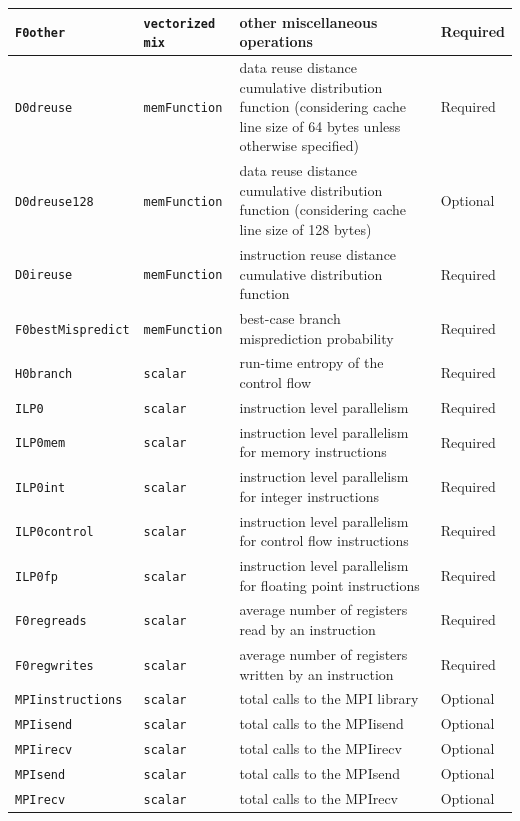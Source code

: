 \documentclass[a4paper, 10pt]{article}
\begin{document}
\begin{table}[t!]
\begin{tabular}{|p{3.8cm} | p{1.5cm} ||p{7.6cm}| p{1.7cm} |}
\hline
\texttt{F0other} &\texttt{vectorized mix} & other miscellaneous operations & Required \\
\hline
\texttt{D0dreuse} &\texttt{memFunction} & data reuse distance cumulative distribution function
(considering cache line size of 64 bytes unless otherwise specified) & Required \\
\hline
\texttt{D0dreuse128} &\texttt{memFunction} & data reuse distance cumulative distribution function
(considering cache line size of 128 bytes) & Optional \\
\hline
\texttt{D0ireuse} &\texttt{memFunction} & instruction reuse distance cumulative distribution function & Required \\
\hline
\texttt{F0bestMispredict} &\texttt{memFunction} & best-case branch misprediction probability & Required \\
\hline
\texttt{H0branch} &\texttt{scalar} & run-time entropy of the control flow & Required \\
\hline
\texttt{ILP0} &\texttt{scalar} & instruction level parallelism & Required \\
\hline
\texttt{ILP0mem} &\texttt{scalar} & instruction level parallelism for memory instructions & Required \\
\hline
\texttt{ILP0int} &\texttt{scalar} & instruction level parallelism for integer instructions & Required \\
\hline
\texttt{ILP0control} &\texttt{scalar} & instruction level parallelism for control flow instructions & Required \\
\hline
\texttt{ILP0fp} &\texttt{scalar} & instruction level parallelism for floating point instructions & Required \\
\hline
\texttt{F0regreads} &\texttt{scalar} & average number of registers read by an instruction & Required \\
\hline
\texttt{F0regwrites} &\texttt{scalar} & average number of registers written by an instruction & Required \\
\hline
\texttt{MPIinstructions} &\texttt{scalar} & total calls to the MPI library & Optional \\
\hline
\texttt{MPIisend} &\texttt{scalar} & total calls to the MPIisend & Optional \\
\hline
\texttt{MPIirecv} &\texttt{scalar} & total calls to the MPIirecv  & Optional \\
\hline
\texttt{MPIsend} &\texttt{scalar} & total calls to the MPIsend  & Optional \\
\hline
\texttt{MPIrecv} &\texttt{scalar} & total calls to the MPIrecv  & Optional \\

\end{tabular}
\end{table}
\end{document}
